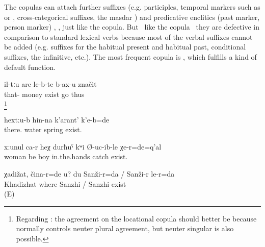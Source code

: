 The copulas can attach further suffixes (e.g. participles, temporal markers such as  or , cross-categorical suffixes, the masdar )  and predicative enclitics (past marker, person marker) , , just like the copula. But \tnd\ like the copula \tnd\ they are defective in comparison to standard lexical verbs because most of the verbal suffixes cannot be added (e.g. suffixes for the habitual present and habitual past, conditional suffixes, the infinitive, etc.). The most frequent copula is , which fulfills a kind of default function.
%
\begin{exe}
	\ex	\label{ex:This means that (people) go where the money is}
	\gll	il-tːu	arc	le-b-te 	b-ax-u	značit\\
		that-	money	exist 	go	thus\\
	\glt	{}\footnote{Regarding : the agreement on the locational copula should better be  because   normally controls neuter plural agreement, but neuter singular is also possible.}

	\ex	\label{ex:There was a spring up there}
	\gll	hextːu-b	hin-na	k'arant'	k'e-b=de\\
		there.	water	spring	exist.\\
	\glt	{}

	\ex	\label{ex:That is the woman, the one who was keeping the boy in here hands}
	\gll	xːunul	ca-r	heχ	durħuˁ	kʷi	Ø-uc-ib-le	χe-r=de=q'al\\
		woman	be		boy	in.the.hands	catch	exist.\\
	\glt	{}

	\ex	\label{ex:‎Khadizhat, where are you? I am in Sanzhi_1}
	\gll	χadižat,	čina-r=de	u?	du	Sanži-r=da	/	Sanži-r	le-r=da\\
		Khadizhat	where			Sanzhi	/ Sanzhi exist\\
	\glt	{} (E)

\end{exe}

